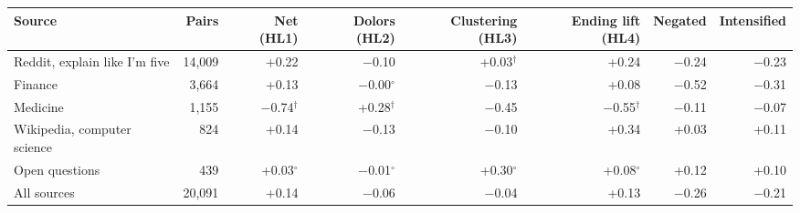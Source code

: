 \begin{tabular}{@{}lrrrrrrr@{}}
\toprule
Source & Pairs & Net (HL1) & Dolors (HL2) & Clustering (HL3) & Ending lift (HL4) & Negated & Intensified \\
\midrule
Reddit, explain like I'm five & 14,009 & +0.22 & \ensuremath{-}0.10 & +0.03$^{\dagger}$ & +0.24 & \ensuremath{-}0.24 & \ensuremath{-}0.23 \\
Finance & 3,664 & +0.13 & \ensuremath{-}0.00$^{\circ}$ & \ensuremath{-}0.13 & +0.08 & \ensuremath{-}0.52 & \ensuremath{-}0.31 \\
Medicine & 1,155 & \ensuremath{-}0.74$^{\dagger}$ & +0.28$^{\dagger}$ & \ensuremath{-}0.45 & \ensuremath{-}0.55$^{\dagger}$ & \ensuremath{-}0.11 & \ensuremath{-}0.07 \\
Wikipedia, computer science & 824 & +0.14 & \ensuremath{-}0.13 & \ensuremath{-}0.10 & +0.34 & +0.03 & +0.11 \\
Open questions & 439 & +0.03$^{\circ}$ & \ensuremath{-}0.01$^{\circ}$ & +0.30$^{\circ}$ & +0.08$^{\circ}$ & +0.12 & +0.10 \\
\midrule
All sources & 20,091 & +0.14 & \ensuremath{-}0.06 & \ensuremath{-}0.04 & +0.13 & \ensuremath{-}0.26 & \ensuremath{-}0.21 \\
\bottomrule
\end{tabular}
